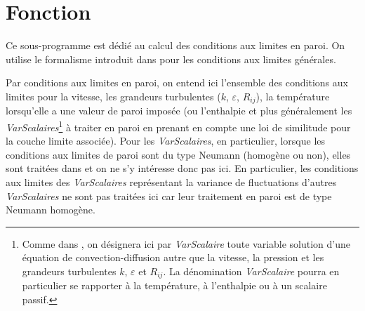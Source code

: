 %
% 
%
% 
% 
% 
%
%


\vspace{1cm}
\section{Fonction}
Ce sous-programme est d\'edi\'e au calcul des conditions aux limites en paroi. 
On utilise le formalisme introduit dans  pour les conditions
aux limites g\'en\'erales. 

Par conditions aux limites en paroi, on entend ici l'ensemble des conditions aux
limites pour la vitesse, les grandeurs turbulentes ($k$, $\varepsilon$,
$R_{ij}$), la temp\'erature lorsqu'elle a une valeur de paroi impos\'ee  
(ou l'enthalpie et plus g\'en\'eralement les 
{\it VarScalaires}\footnote{Comme dans , on d\'esignera ici par 
{\it VarScalaire} toute variable solution
d'une \'equation de convection-diffusion autre que la 
vitesse, la pression et les grandeurs turbulentes $k$, $\varepsilon$ et
$R_{ij}$. La d\'enomination {\it VarScalaire} pourra en particulier se rapporter
\`a la temp\'erature, \`a l'enthalpie ou \`a un scalaire passif.} 
\`a traiter en paroi en prenant en compte une loi de similitude
pour la couche limite associ\'ee). Pour les {\it VarScalaires}, en particulier,
lorsque les conditions aux limites de paroi sont du type Neumann (homog\`ene ou non),
elles sont trait\'ees dans  et on ne s'y int\'eresse donc pas
ici. En particulier, les conditions aux limites des  {\it VarScalaires}
repr\'esentant la variance de fluctuations d'autres  {\it VarScalaires} ne
sont pas trait\'ees ici car leur traitement en paroi est de type Neumann homog\`ene. 

